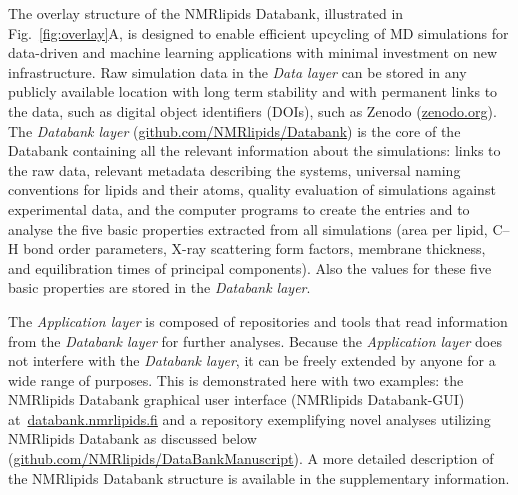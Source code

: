 \documentclass[fleqn,10pt]{wlscirep}
\begin{document}
The overlay structure of the NMRlipids Databank, illustrated in Fig.~\ref{fig:overlay}A, is designed to enable efficient upcycling of MD simulations for data-driven and machine learning applications with minimal investment on new infrastructure. Raw simulation data in the {\it Data layer} can be stored in any publicly available location with long term stability and with permanent links to the data, such as digital object identifiers (DOIs), such as Zenodo (\href{https://zenodo.org}{zenodo.org}). The {\it Databank layer} (\href{https://github.com/NMRlipids/Databank}{github.com/NMRlipids/Databank}) is the core of the Databank containing all the relevant information about the simulations: links to the raw data, relevant metadata describing the systems, universal naming conventions for lipids and their atoms, quality evaluation of simulations against experimental data, and the computer programs to create the entries and to analyse the five basic properties extracted from all simulations (area per lipid, C--H bond order parameters, X-ray scattering form factors, membrane thickness, and equilibration times of principal components). Also the values for these five basic properties are stored in the {\it Databank layer}. 

The {\it Application layer} is composed of repositories and tools that read information from the {\it Databank layer} for further analyses. Because the {\it Application layer} does not interfere with the {\it Databank layer}, it can be freely extended by anyone for a wide range of purposes. This is demonstrated here with two examples: the NMRlipids Databank graphical user interface (NMRlipids Databank-GUI) at~\href{https://www.databank.nmrlipids.fi}{databank.nmrlipids.fi} and a repository exemplifying novel analyses utilizing NMRlipids Databank as discussed below (\href{https://github.com/NMRlipids/DataBankManuscript}{github.com/NMRlipids/DataBankManuscript}). A more detailed description of the NMRlipids Databank structure is available in the supplementary information. 
\end{document}
